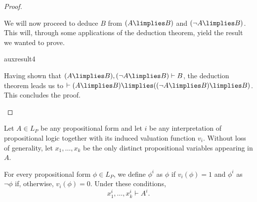 \begin{proof}
\begin{parlist}
We will now proceed to deduce $B$ from $(A\limplies B)$ and $(\lnot A \limplies B)$. This will, through some applications of the deduction theorem, yield the result we wanted to prove.
\begin{deduction}{auxresult4}
\end{deduction}
Having shown that $(A \limplies B), (\lnot A \limplies B) \vdash B$, the deduction theorem leads us to $\vdash (A\limplies B) \limplies ( (\lnot A \limplies B) \limplies B)$. This concludes the proof.
\end{parlist}
\end{proof}

\begin{lemma}
Let $A\in L_P$ be any propositional form and let $i$ be any interpretation of propositional logic together with its induced valuation function $v_i$.
Without loss of generality, let $x_1,\ldots,x_k$ be the only distinct propositional variables appearing in $A$.

For every propositional form $\phi \in L_{P}$, we define $\phi^i$ as $\phi$ if $v_i(\phi) = 1$ and $\phi^i$ as $\lnot \phi$ if, otherwise, $v_i(\phi) = 0$.
Under these conditions,
\[ x_1^i,\ldots,x_k^i \vdash A^i.\]
\label{<+label+>}
\end{lemma}

